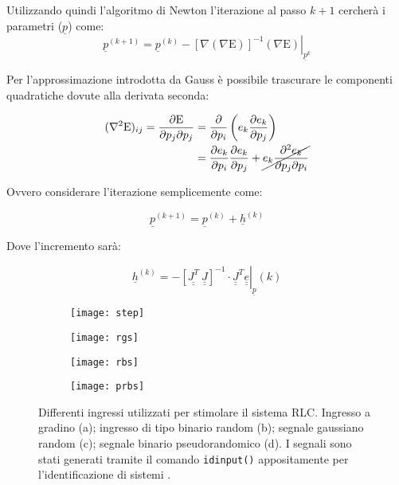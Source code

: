 Utilizzando quindi l'algoritmo di Newton l'iterazione al passo $k+1$ cercherà i parametri ($\underline p$) come:
\begin{equation}
\underline{p}^{(k+1)}=\underline{p}^{(k)}-\left.[\nabla \left(\nabla \mathrm E\right)]^{-1} \left(\nabla \mathrm E \right)\right|_{\underline{p}^{k}}	
\end{equation}

Per l'approssimazione introdotta da Gauss \cite{nocedal_numerical_2006} è possibile trascurare le componenti quadratiche dovute alla derivata seconda: 

\begin{equation}
	\begin{aligned}
	(\nabla^2 \mathrm{E})_{i j}=\frac{\partial \mathrm{E}}{\partial p_{j} \partial p_{j}}&=\frac{\partial}{\partial p_{i}}\left(e_{k} \frac{\partial e_{k}}{\partial p_{j}}\right)\\&=\frac{\partial e_{k}}{\partial p_{i}} \frac{\partial e_{k}}{\partial p_{j}}+\cancel{e_{k} \frac{\partial^{2} e_{k}}{\partial p_{j} \partial p_{i}}}	
	\end{aligned}	
\end{equation}

Ovvero considerare l'iterazione semplicemente come:

\begin{equation}
\underline{p}^{(k+1)}=\underline{p}^{(k)}+\underline h^{(k)}
\end{equation}

Dove l'incremento sarà:

\begin{equation}
\underline h^{(k)}=-\left.\left[\underline{\underline{J^{T}}} \:\underline{\underline{J}}\right]^{-1} \cdot \underline{\underline{J}}^{T} \underline{\underline{e}}\right|_{\underline{p}}(k)
\end{equation}


\begin{figure*}
	\begin{subfigure}{0.25\linewidth}
		\texttt{[image: step]}
		\caption{}
	\end{subfigure}\hfill
	\begin{subfigure}{0.25\linewidth}
		\texttt{[image: rgs]}
		\caption{}
	\end{subfigure}\hfill
	\begin{subfigure}{0.25\linewidth}
		\texttt{[image: rbs]}
		\caption{}
	\end{subfigure}\hfill
	\begin{subfigure}{0.25\linewidth}
		\texttt{[image: prbs]}
		\caption{}
	\end{subfigure}\hfill
	\caption{Differenti ingressi utilizzati per stimolare il sistema RLC. Ingresso a gradino (a); ingresso di tipo binario random (b); segnale gaussiano random (c); segnale binario pseudorandomico (d). I segnali sono stati generati tramite il comando \texttt{idinput()} appositamente per l'identificazione di sistemi \cite{idinput}.}
	\label{fig:inputs}
\end{figure*}


